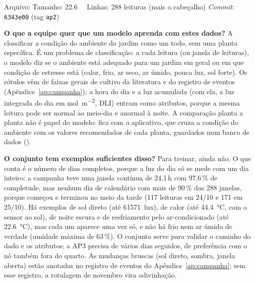\noindent Arquivo:  \quad Tamanho:
\SI{22.6}{\kilo\byte} \quad Linhas: 288 leituras (mais o cabeçalho) \quad \emph{Commit}:
\texttt{6343e00} (tag \texttt{ap2})

\noindent\textbf{O que a equipe quer que um modelo aprenda com estes dados?}
A classificar a condição do ambiente do jardim como um todo, sem uma
planta específica. É um problema de classificação: a cada leitura (ou
janela de leituras), o modelo diz se o ambiente está adequado para um
jardim em geral ou em que condição de estresse está (calor, frio, ar
seco, ar úmido, pouca luz, sol forte). Os rótulos vêm de faixas gerais
de cultivo da literatura e do registro de eventos (Apêndice~\ref{ap:campanha});
a hora do dia e a luz acumulada (com ela, a luz integrada do dia em
\si{\mol\per\square\metre}, DLI) entram como atributos, porque a mesma
leitura pode ser normal ao meio-dia e anormal à noite. A comparação
planta a planta não é papel do modelo: fica com o aplicativo, que cruza
a condição do ambiente com os valores recomendados de cada planta,
guardados num banco de dados ().

\noindent\textbf{O conjunto tem exemplos suficientes disso?} Para treinar,
ainda não. O que conta é o número de dias completos, porque a luz do dia
só se mede com um dia inteiro: a campanha teve uma janela contínua de
24,1\,h com 97,6\,\% de completude, mas nenhum dia de calendário com mais
de 90\,\% das 288 janelas, porque começou e terminou no meio da tarde
(117 leituras em 24/10 e 171 em 25/10). Há exemplos de sol direto (até
\SI{61571}{lux}), de calor (até \SI{44.4}{\celsius}, com o sensor ao
sol), de noite escura e de resfriamento pelo ar-condicionado (até
\SI{22.6}{\celsius}), mas cada um aparece uma vez só, e não há frio nem ar
úmido de verdade (umidade máxima de 63\,\%). O conjunto serve para validar
o caminho do dado e os atributos; a AP3 precisa de vários dias seguidos,
de preferência com o nó também fora do quarto. As mudanças bruscas
(sol direto, sombra, janela aberta) estão anotadas no registro de eventos do
Apêndice~\ref{ap:campanha}; sem esse registro, a rotulagem de novembro
vira adivinhação.
